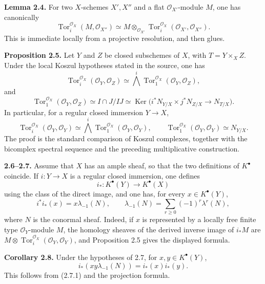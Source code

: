 \documentclass[11pt]{article}
\newcommand{\Tor}{\operatorname{Tor}}
\providecommand{\Tor}{\operatorname{Tor}}
\providecommand{\Ker}{\operatorname{Ker}}
\providecommand{\cO}{\mathcal O}
\begin{document}
\textbf{Lemma 2.4.} For two \(X\)-schemes \(X',X''\) and a flat \(\cO_{X'}\)-module \(M\), one has canonically
\begin{equation}\tag{2.4.1}
\Tor_i^{\cO_X}(M,\cO_{X''})\simeq
M\otimes_{\cO_{X'}}\Tor_i^{\cO_X}(\cO_{X'},\cO_{X''}).
\end{equation}
This is immediate locally from a projective resolution, and then glues.

\textbf{Proposition 2.5.} Let \(Y\) and \(Z\) be closed subschemes of \(X\), with \(T=Y\times_XZ\). Under the local Koszul hypotheses stated in the source, one has
\begin{equation}\tag{2.5.1}
\Tor_i^{\cO_X}(\cO_Y,\cO_Z)\simeq \bigwedge^i\Tor_1^{\cO_X}(\cO_Y,\cO_Z),
\end{equation}
and
\begin{equation}\tag{2.5.2}
\Tor_1^{\cO_X}(\cO_Y,\cO_Z)
\simeq I\cap J/IJ
\simeq \Ker\bigl(i^*N_{Y/X}\times j^*N_{Z/X}\to N_{T/X}\bigr).
\end{equation}
In particular, for a regular closed immersion \(Y\to X\),
\begin{equation}\tag{2.5.3}
\Tor_i^{\cO_X}(\cO_Y,\cO_Y)\simeq
\bigwedge^i\Tor_1^{\cO_X}(\cO_Y,\cO_Y),
\qquad
\Tor_1^{\cO_X}(\cO_Y,\cO_Y)\simeq N_{Y/X}.
\end{equation}
The proof is the standard comparison of Koszul complexes, together with the bicomplex spectral sequence and the preceding multiplicative construction.

\textbf{2.6--2.7.} Assume that \(X\) has an ample sheaf, so that the two definitions of \(K^\bullet\) coincide. If \(i:Y\to X\) is a regular closed immersion, one defines
\[
i_*:K^\bullet(Y)\to K^\bullet(X)
\]
using the class of the direct image, and one has, for every \(x\in K^\bullet(Y)\),
\begin{equation}\tag{2.7.1}
i^*i_*(x)=x\lambda_{-1}(N),
\qquad
\lambda_{-1}(N)=\sum_{r\ge0}(-1)^r\lambda^r(N),
\end{equation}
where \(N\) is the conormal sheaf. Indeed, if \(x\) is represented by a locally free finite type \(\cO_Y\)-module \(M\), the homology sheaves of the derived inverse image of \(i_*M\) are \(M\otimes\Tor_i^{\cO_X}(\cO_Y,\cO_Y)\), and Proposition 2.5 gives the displayed formula.

\textbf{Corollary 2.8.} Under the hypotheses of 2.7, for \(x,y\in K^\bullet(Y)\),
\begin{equation}\tag{2.8.1}
i_*(xy\lambda_{-1}(N))=i_*(x)i_*(y).
\end{equation}
This follows from (2.7.1) and the projection formula.
\end{document}
